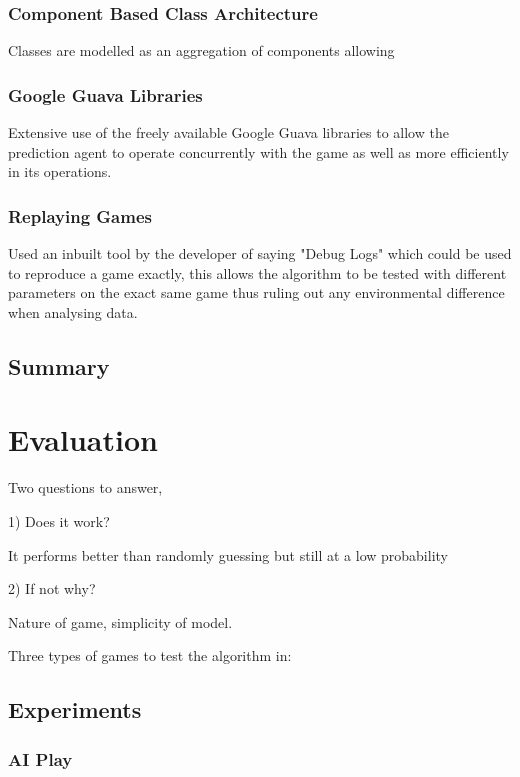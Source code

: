 \documentclass[parskip]{cs4rep}
\begin{document}
\subsection{Component Based Class Architecture}

Classes are modelled as an aggregation of components allowing

\subsection{Google Guava Libraries}

Extensive use of the freely available Google Guava libraries to allow the prediction agent to operate concurrently with the game as well as more efficiently in its operations.

\subsection{Replaying Games}

Used an inbuilt tool by the developer of saying "Debug Logs" which could be used to reproduce a game exactly, this allows the algorithm to be tested with different parameters on the exact same game thus ruling out any environmental difference when analysing data.

\section{Summary}

\chapter{Evaluation}

Two questions to answer, 

1) Does it work?

It performs better than randomly guessing but still at a low probability

2) If not why?

Nature of game, simplicity of model.

Three types of games to test the algorithm in:

\section{Experiments}

\subsection{AI Play}
\end{document}
